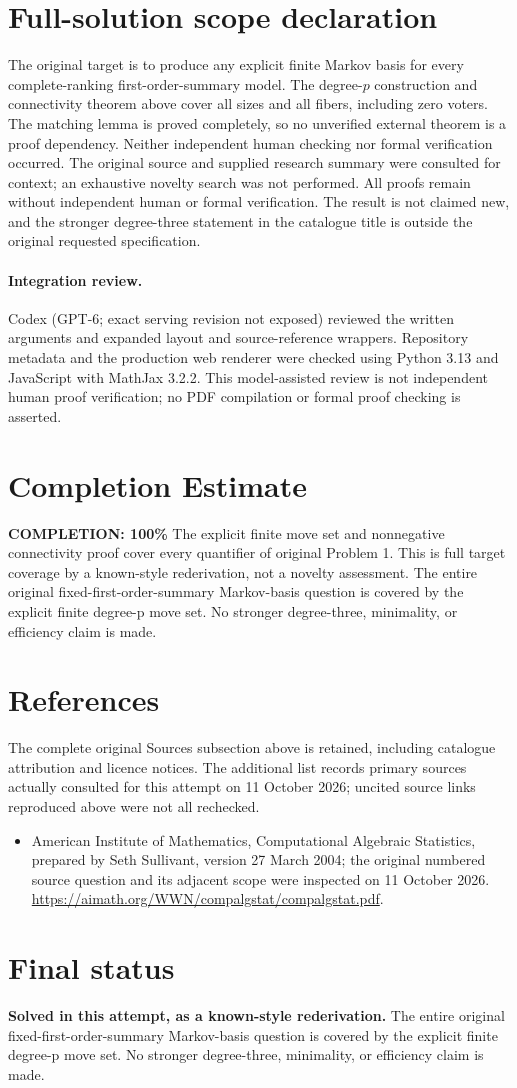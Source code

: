 \documentclass[11pt]{article}
\begin{document}
\section{Full-solution scope declaration}
The original target is to produce any explicit finite Markov basis for every complete-ranking first-order-summary model. The degree-$p$ construction and connectivity theorem above cover all sizes and all fibers, including zero voters. The matching lemma is proved completely, so no unverified external theorem is a proof dependency. Neither independent human checking nor formal verification occurred. The original source and supplied research summary were consulted for context; an exhaustive novelty search was not performed. All proofs remain without independent human or formal verification. The result is not claimed new, and the stronger degree-three statement in the catalogue title is outside the original requested specification.
\paragraph{Integration review.} Codex (GPT-6; exact serving revision not exposed) reviewed the written arguments and expanded layout and source-reference wrappers. Repository metadata and the production web renderer were checked using Python 3.13 and JavaScript with MathJax 3.2.2. This model-assisted review is not independent human proof verification; no PDF compilation or formal proof checking is asserted.

\section{Completion Estimate}
\noindent\textbf{COMPLETION: 100\%}
The explicit finite move set and nonnegative connectivity proof cover every quantifier of original Problem 1. This is full target coverage by a known-style rederivation, not a novelty assessment. The entire original fixed-first-order-summary Markov-basis question is covered by the explicit finite degree-p move set. No stronger degree-three, minimality, or efficiency claim is made.
\section{References}
The complete original Sources subsection above is retained, including catalogue attribution and licence notices. The additional list records primary sources actually consulted for this attempt on 11 October 2026; uncited source links reproduced above were not all rechecked.
\begin{itemize}
\item American Institute of Mathematics, Computational Algebraic Statistics, prepared by Seth Sullivant, version 27 March 2004; the original numbered source question and its adjacent scope were inspected on 11 October 2026. \url{https://aimath.org/WWN/compalgstat/compalgstat.pdf}.
\end{itemize}
\section{Final status}
\textbf{Solved in this attempt, as a known-style rederivation.} The entire original fixed-first-order-summary Markov-basis question is covered by the explicit finite degree-p move set. No stronger degree-three, minimality, or efficiency claim is made.
\end{document}
